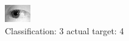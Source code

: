 \begin{figure}[h!]
\begin{center}
\includegraphics[width=0.60\columnwidth]{figures/ID1244_class_3_target_4.png}
\end{center}
\caption{ Classification: 3 actual target: 4}
\label{fig:ID1244_class_3_target_4}
\end{figure}

